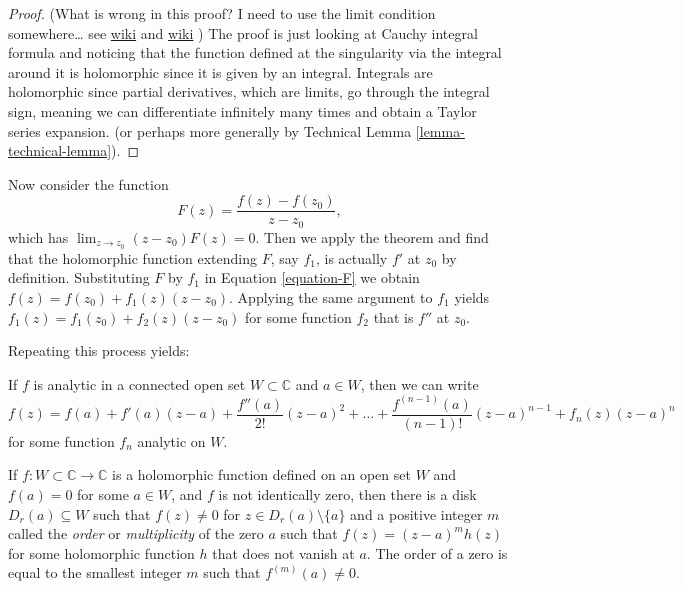 \begin{proof}
(What is wrong in this proof? I need to use
the limit condition somewhere… see 
\href{https://en.wikipedia.org/wiki/Removable_singularity}{wiki} and
\href{https://en.wikipedia.org/wiki/Analyticity_of_holomorphic_functions}{wiki}
)
The proof is just looking at Cauchy integral formula and noticing that the
function defined at the singularity via the integral around it is holomorphic
since it is given by an integral.
Integrals are holomorphic since partial derivatives, which are limits,
go through the integral sign, meaning we can differentiate
infinitely many times and obtain a Taylor series expansion.
(or perhaps more generally by Technical
Lemma \ref{lemma-technical-lemma}).
\end{proof}

\noindent
Now consider the function
\begin{equation}
\label{equation-F}
F(z)=\frac{f(z)-f(z_0)}{z-z_0},
\end{equation}
which has $\lim_{z\to z_0} (z-z_0)F(z)=0$. Then we apply the theorem and find
that the holomorphic function extending $F$, say $f_1$, is actually $f'$ at
$z_0$ by definition. 
Substituting $F$ by $f_1$
in Equation \ref{equation-F} we obtain
$f(z)=f(z_0)+f_1(z)(z-z_0)$. Applying the same
argument to $f_1$ yields $f_1(z)=f_1(z_0)+f_2(z)(z-z_0)$ for some function
$f_2$ that is $f''$ at $z_0$.

Repeating this process yields:

\begin{lemma}
\label{lemma-finite-Taylor-expansion}
\begin{reference}
\cite[Chapter 4, Section 3, Subsection 2, Theorem 8]{ahl}
\end{reference}
If $f$ is analytic in a connected open set $W\subset\mathbb{C}$ and $a \in W$,
then we can write
\begin{equation}
\label{equation-finite-Taylor-expansion}
f(z)=f(a)+f'(a)(z-a)+\frac{f''(a)}{2!}(z-a)^2+\ldots
+\frac{f^{(n-1)}(a)}{(n-1)!}(z-a)^{n-1}+f_n(z)(z-a)^n
\end{equation}
for some function $f_n$ analytic on $W$.
\end{lemma}

\begin{theorem}
\label{theorem-zeroes-are-isolated-and-have-finite-order}
\begin{reference}
\cite[p. 13]{lec}
\end{reference}
If $f:W\subset\mathbb{C}\to \mathbb{C}$ is a holomorphic function defined on an
open set $W$ and $f(a)=0$ for some $a\in W$, and $f$ is not identically zero,
then there is a disk $D_r(a)\subseteq W$ such that $f(z)\neq 0$ for $z \in
D_r(a)\setminus\{a\}$ and a positive integer $m$ called the {\it order} or
{\it multiplicity} of the zero $a$ such that  $f(z)=(z-a)^mh(z)$ for some
holomorphic function $h$ that does not vanish at $a$. The order of a zero is
equal to the smallest integer $m$ such that $f^{(m)}(a)\neq 0$.
\end{theorem}

